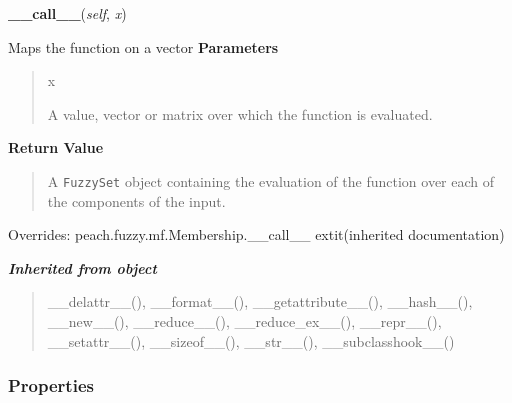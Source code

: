 \hspace{.8\funcindent}\begin{boxedminipage}{\funcwidth}

    \raggedright \textbf{\_\_call\_\_}(\textit{self}, \textit{x})

\setlength{\parskip}{2ex}

Maps the function on a vector
\setlength{\parskip}{1ex}
      \textbf{Parameters}
      \vspace{-1ex}

      \begin{quote}
        \begin{Ventry}{x}

          \item[x]


A value, vector or matrix over which the function is evaluated.
        \end{Ventry}

      \end{quote}

      \textbf{Return Value}
    \vspace{-1ex}

      \begin{quote}

A \texttt{FuzzySet} object containing the evaluation of the function over
each of the components of the input.
      \end{quote}

      Overrides: peach.fuzzy.mf.Membership.\_\_call\_\_ 	extit{(inherited documentation)}

    \end{boxedminipage}


\large{\textbf{\textit{Inherited from object}}}

\begin{quote}
\_\_delattr\_\_(), \_\_format\_\_(), \_\_getattribute\_\_(), \_\_hash\_\_(), \_\_new\_\_(), \_\_reduce\_\_(), \_\_reduce\_ex\_\_(), \_\_repr\_\_(), \_\_setattr\_\_(), \_\_sizeof\_\_(), \_\_str\_\_(), \_\_subclasshook\_\_()
\end{quote}


  \subsubsection{Properties}

